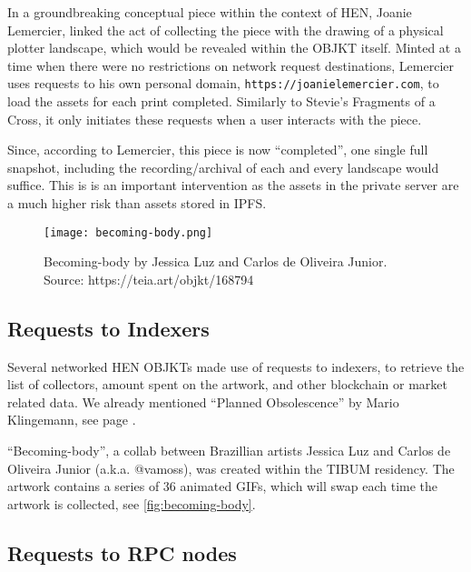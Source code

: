 In a groundbreaking conceptual piece within the context of HEN, Joanie Lemercier, linked the act of collecting the piece with the drawing of a physical plotter landscape, which would be revealed within the OBJKT itself. Minted at a time when there were no restrictions on network request destinations, Lemercier uses requests to his own personal domain, \texttt{https://joanielemercier.com}, to load the assets for each print completed. Similarly to Stevie's Fragments of a Cross, it only initiates these requests when a user interacts with the piece.

Since, according to Lemercier, this piece is now ``completed'', one single full snapshot, including the recording/archival of each and every landscape would suffice. This is is an important intervention as the assets in the private server are a much higher risk than assets stored in IPFS.

\begin{figure}[h]
    \centering
    \captionsetup{justification=centering}
    \texttt{[image: becoming-body.png]}
    \captionsetup{justification=centering}
    \caption[Becoming-body by Jessica Luz and Carlos de Oliveira Junior]{Becoming-body by Jessica Luz and Carlos de Oliveira Junior. \\ Source: https://teia.art/objkt/168794}
    \label{fig:becoming-body}
\end{figure}

\subsection{Requests to Indexers}

Several networked HEN OBJKTs made use of requests to indexers, to retrieve the list of collectors, amount spent on the artwork, and other blockchain or market related data.
We already mentioned ``Planned Obsolescence'' by Mario Klingemann, see page \pageref{fig:plannedobsolescence}.

``Becoming-body'', a collab between Brazillian artists Jessica Luz and Carlos de Oliveira Junior (a.k.a. @vamoss), was created within the TIBUM residency. The artwork contains a series of 36 animated GIFs, which will swap each time the artwork is collected, see \autoref{fig:becoming-body}.


\subsection{Requests to RPC nodes}

